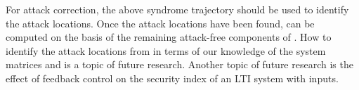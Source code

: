 \documentclass[letterpaper, 10 pt, conference]{ieeeconf}
\begin{document}
For attack correction, the above syndrome trajectory  should be used to identify the attack locations.  Once the attack locations have been found,  can be computed on the basis of the remaining attack-free components of . How to identify the attack locations from  in terms of our knowledge of the system matrices  and  is a topic of future research. Another topic of future research is the effect of feedback control on the security index of an LTI system with inputs.




\addtolength{\textheight}{-12cm}   











\end{document}
